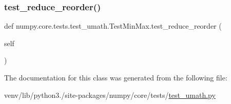 \subsubsection{\texorpdfstring{test\+\_\+reduce\+\_\+reorder()}{test\_reduce\_reorder()}}
{\footnotesize\ttfamily def numpy.\+core.\+tests.\+test\+\_\+umath.\+Test\+Min\+Max.\+test\+\_\+reduce\+\_\+reorder (\begin{DoxyParamCaption}\item[{}]{self }\end{DoxyParamCaption})}



The documentation for this class was generated from the following file\+:\begin{DoxyCompactItemize}
\item 
venv/lib/python3./site-\/packages/numpy/core/tests/\hyperlink{test__umath_8py}{test\+\_\+umath.\+py}\end{DoxyCompactItemize}
